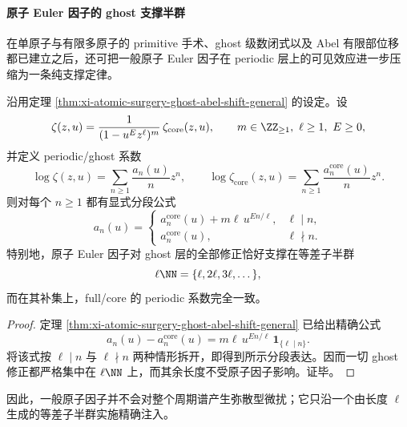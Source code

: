 \paragraph{原子 Euler 因子的 ghost 支撑半群}
在单原子与有限多原子的 primitive 手术、ghost 级数闭式以及 Abel 有限部位移都已建立之后，还可把一般原子 Euler 因子在 periodic 层上的可见效应进一步压缩为一条纯支撑定律。

\begin{corollary}\label{cor:xi-time-part53aa-atomic-ghost-subsemigroup-support}
沿用定理 \ref{thm:xi-atomic-surgery-ghost-abel-shift-general} 的设定。设
\[
\zeta(z,u)=\frac{1}{(1-u^Ez^\ell)^m}\,\zeta_{\mathrm{core}}(z,u),
\qquad
m\in\ZZ_{\ge 1},\ \ell\ge 1,\ E\ge 0,
\]
并定义 periodic/ghost 系数
\[
\log \zeta(z,u)=\sum_{n\ge 1}\frac{a_n(u)}{n}z^n,
\qquad
\log \zeta_{\mathrm{core}}(z,u)=\sum_{n\ge 1}\frac{a_n^{\mathrm{core}}(u)}{n}z^n.
\]
则对每个 \(n\ge 1\) 都有显式分段公式
\[
\boxed{\;
a_n(u)
=
\begin{cases}
a_n^{\mathrm{core}}(u)+m\ell\,u^{En/\ell}, & \ell\mid n,\\[4pt]
a_n^{\mathrm{core}}(u), & \ell\nmid n.
\end{cases}\;}
\]
特别地，原子 Euler 因子对 ghost 层的全部修正恰好支撑在等差子半群
\[
\ell\NN=\{\ell,2\ell,3\ell,\dots\},
\]
而在其补集上，full/core 的 periodic 系数完全一致。
\end{corollary}
\begin{proof}
定理 \ref{thm:xi-atomic-surgery-ghost-abel-shift-general} 已给出精确公式
\[
a_n(u)-a_n^{\mathrm{core}}(u)
=
m\ell\,u^{En/\ell}\,\mathbf 1_{\{\ell\mid n\}}.
\]
将该式按 \(\ell\mid n\) 与 \(\ell\nmid n\) 两种情形拆开，即得到所示分段表达。因而一切 ghost 修正都严格集中在 \(\ell\NN\) 上，而其余长度不受原子因子影响。证毕。
\end{proof}

\noindent
因此，一般原子因子并不会对整个周期谱产生弥散型微扰；它只沿一个由长度 \(\ell\) 生成的等差子半群实施精确注入。

\endinput
